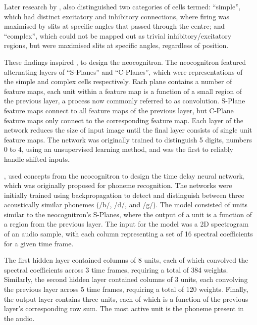 Later research by \cite{Hubel:1962:Receptive}, also distinguished two categories
of cells termed:
``simple'', which had distinct excitatory and inhibitory connections, where
firing was maximised by slits at specific angles that passed through the centre;
and ``complex'', which could not be mapped out as trivial inhibitory/excitatory
regions, but were maximised slits at specific angles, regardless of position.



These findings inspired \cite{Fukushima:1980:Neocognitron}, to design the
neocognitron.
The neocognitron featured alternating layers of ``S-Planes'' and ``C-Planes'',
which were representations of the simple and complex cells respectively.
Each plane contains a number of feature maps, each unit within a feature map
is a function of a small region of the previous layer, a process now commonly
referred to as convolution.
S-Plane feature maps connect to all feature maps of the previous layer,
but C-Plane feature maps only connect to the corresponding feature map.
Each layer of the network reduces the size of input image until the final layer
consists of single unit feature maps.
The network was originally trained to distinguish 5 digits, numbers 0 to 4,
using an unsupervised learning method, and was the first to reliably handle
shifted inputs.



\cite{Waibel:1989:Phoneme}, used concepts from the neocognitron to design the
time delay neural network, which was originally proposed for phoneme
recognition.
The networks were initially trained using backpropagation to detect and
distinguish between three acoustically similar phonemes (/b/, /d/, and /g/).
The model consisted of units similar to the neocognitron's S-Planes, where the
output of a unit is a function of a region from the previous layer.
The input for the model was a 2D spectrogram of an audio sample, with each
column representing a set of 16 spectral coefficients for a given time frame.

The first hidden layer contained columns of 8 units, each of which convolved the
spectral coefficients across 3 time frames, requiring a total of 384 weights.
Similarly, the second hidden layer contained columns of 3 units, each convolving
the previous layer across 5 time frames, requiring a total of 120 weights.
Finally, the output layer contains three units, each of which is a function of
the previous layer's corresponding row sum.
The most active unit is the phoneme present in the audio.


